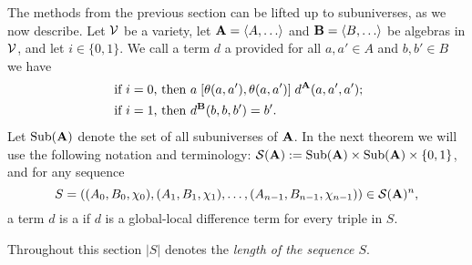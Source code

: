 The methods from the previous section can be lifted
up to subuniverses, as we now describe.
Let $\mathcal{V}$ be a variety, let $\bA = \<A, \dots\>$ and $\bB = \<B, \dots\>$ be algebras in
$\mathcal{V}$, and let $i\in \{0,1\}$.
We call a term $d$ a 
provided for all $a, a'\in A$ and $b, b' \in B$ we have
\begin{align}
\text{ if $i=0$, then } & a \mathrel{[\theta(a,a'), \theta(a,a')]} d^{\mathbf{A}}(a,a',a');
\label{eq:global-diff-triple}\\
\text{ if $i=1$, then } &
d^{\mathbf{B}}(b,b,b') = b'. 
\end{align}
Let $\operatorname{Sub}(\mathbf{A})$ denote the set of all
subuniverses of $\mathbf{A}$. In the next theorem we will use the following notation and terminology:
$\mathcal{S}(\mathbf{A}):= \operatorname{Sub}(\mathbf{A}) \times \operatorname{Sub}(\mathbf{A}) \times \{0,1\}$, and for any
sequence
\[S = ((A_0, B_0, \chi_0), (A_1, B_1, \chi_1), \dots,
(A_{n-1},B_{n-1},\chi_{n-1})) \in \mathcal{S}(\mathbf{A})^n,
\]
a term $d$ is a 
if $d$ is a global-local difference term for every triple in $S$.

Throughout this section $|S|$ denotes the \emph{length of the
sequence $S$}.


